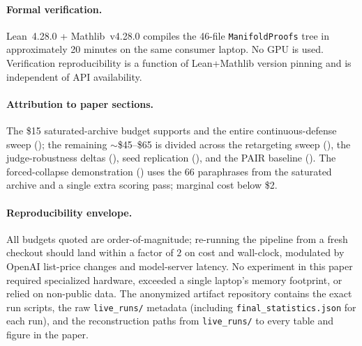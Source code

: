 \paragraph{Formal verification.}
Lean~4.28.0 + Mathlib~v4.28.0 compiles the 46-file \texttt{ManifoldProofs}
tree in approximately 20 minutes on the same consumer laptop. No GPU
is used. Verification reproducibility is a function of Lean+Mathlib
version pinning and is independent of API availability.

\paragraph{Attribution to paper sections.}
The \$15 saturated-archive budget supports
 and the entire
continuous-defense sweep (); the
remaining $\sim$\$45--\$65 is divided across the retargeting sweep
(), the judge-robustness deltas
(), seed replication
(), and the PAIR baseline
(). The forced-collapse demonstration
() uses the 66
paraphrases from the saturated archive and a single extra scoring
pass; marginal cost below \$2.

\paragraph{Reproducibility envelope.}
All budgets quoted are order-of-magnitude; re-running the pipeline
from a fresh checkout should land within a factor of $2$ on cost and
wall-clock, modulated by OpenAI list-price changes and model-server
latency. No experiment in this paper required specialized hardware,
exceeded a single laptop's memory footprint, or relied on
non-public data. The anonymized artifact repository contains the
exact run scripts, the raw \texttt{live\_runs/} metadata (including
\texttt{final\_statistics.json} for each run), and the
reconstruction paths from \texttt{live\_runs/} to every table and
figure in the paper.
